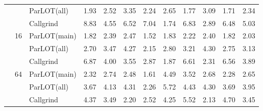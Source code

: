 \begin{table*}[]
\begin{center}
\begin{tabular}{|c|c|l|rrrrrrrr|r|}
 &  & ParLOT(all) & 1.93 & 2.52 & 3.35 & 2.24 & 2.65 & 1.77 & 3.09 & 1.71 & 2.34 \\
 &  & Callgrind & 8.83 & 4.55 & 6.52 & 7.04 & 1.74 & 6.83 & 2.89 & 6.48 & 5.03 \\ \cline{2-12} 
 & \multirow{3}{*}{16} & ParLOT(main) & 1.82 & 2.39 & 2.47 & 1.52 & 1.83 & 2.22 & 2.40 & 1.82 & 2.03 \\
 &  & ParLOT(all) & 2.70 & 3.47 & 4.27 & 2.15 & 2.80 & 3.21 & 4.30 & 2.75 & 3.13 \\
 &  & Callgrind & 6.87 & 4.00 & 3.55 & 2.87 & 1.87 & 6.61 & 2.31 & 6.56 & 3.89 \\ \cline{2-12} 
 & \multirow{3}{*}{64} & ParLOT(main) & 2.32 & 2.74 & 2.48 & 1.61 & 4.49 & 3.52 & 2.68 & 2.28 & 2.65 \\
 &  & ParLOT(all) & 3.67 & 4.13 & 4.31 & 2.26 & 5.72 & 4.43 & 4.30 & 3.69 & 3.95 \\
 &  & Callgrind & 4.37 & 3.49 & 2.20 & 2.52 & 4.25 & 5.52 & 2.13 & 4.70 & 3.45 \\ \hline
\end{tabular}
\end{center}
\end{table*}

\fi